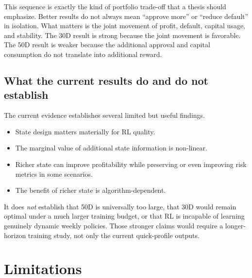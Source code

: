 \documentclass[12pt,a4paper]{article}
\begin{document}
This sequence is exactly the kind of portfolio trade-off that a thesis should emphasize. Better results do not always mean ``approve more'' or ``reduce default'' in isolation. What matters is the joint movement of profit, default, capital usage, and stability. The 30D result is strong because the joint movement is favorable. The 50D result is weaker because the additional approval and capital consumption do not translate into additional reward.

\subsection{What the current results do and do not establish}

The current evidence establishes several limited but useful findings.
\begin{itemize}[leftmargin=*]
    \item State design matters materially for RL quality.
    \item The marginal value of additional state information is non-linear.
    \item Richer state can improve profitability while preserving or even improving risk metrics in some scenarios.
    \item The benefit of richer state is algorithm-dependent.
\end{itemize}

It does \emph{not} establish that 50D is universally too large, that 30D would remain optimal under a much larger training budget, or that RL is incapable of learning genuinely dynamic weekly policies. Those stronger claims would require a longer-horizon training study, not only the current quick-profile outputs.

\section{Limitations}
\end{document}
